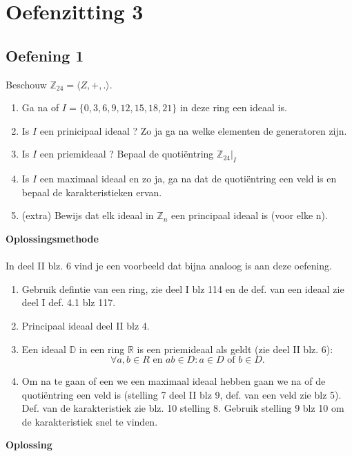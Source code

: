 \documentclass[11pt,a4paper,titlepage]{article}
\begin{document}
\section{Oefenzitting 3}
\subsection{Oefening 1}
Beschouw $\mathbb{Z}_{24} = \langle Z, +, .\rangle$.
\begin{enumerate}[label=(\alph*)]
	\item Ga na of $I = \{0,3,6,9,12,15,18,21\}$ in deze ring een ideaal is.
	\item Is $I$ een prinicipaal ideaal ? Zo ja ga na welke elementen de generatoren zijn.
	\item Is $I$ een priemideaal ? Bepaal de quotiëntring $\mathbb{Z}_{24}|_I$
	\item Is $I$ een maximaal ideaal en zo ja, ga na dat de quotiëntring een veld is en bepaal de karakteristieken ervan.
	\item (extra) Bewijs dat elk ideaal in $\mathbb{Z}_n$ een principaal ideaal is (voor elke n).
\end{enumerate}
\textbf{Oplossingsmethode} \\ \\
In deel II blz. 6 vind je een voorbeeld dat bijna analoog is aan deze oefening.
\begin{enumerate}[label=(\alph*)]
	\item Gebruik defintie van een ring, zie deel I blz 114 en de def. van een ideaal zie deel I def. 4.1 blz 117.
	\item Principaal ideaal deel II blz 4.
	\item Een ideaal $\mathbb{D}$ in een ring $\mathbb{R}$ is een priemideaal als geldt (zie deel II blz. 6):
		$$\forall a, b \in R \text{ en } ab \in D: a\in D \text{ of } b\in D.$$
	\item Om na te gaan of een we een maximaal ideaal hebben gaan we na of de quotiëntring een veld is (stelling 7 deel II blz 9, def. van een veld zie blz 5). \\
		Def. van de karakteristiek zie blz. 10 stelling 8. Gebruik stelling 9 blz 10 om de karakteristiek snel te vinden.
\end{enumerate}
\textbf{Oplossing}
\end{document}
